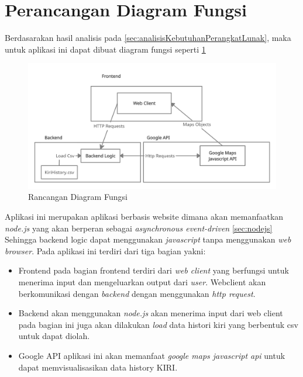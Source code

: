 \section{Perancangan Diagram Fungsi}
\label{sec:perancanganDiagramFungsi}
Berdasarakan hasil analisis pada  \ref{sec:analisisKebutuhanPerangkatLunak}, maka untuk aplikasi ini dapat dibuat diagram fungsi seperti \ref{fig:diagramFungsi} 
\begin{figure}[H]
	\centering  
	\includegraphics[scale=0.3]{Gambar/Kiri_functional_diagram.png}  
	\caption[Rancangan Diagram Kelas]{Rancangan Diagram Fungsi} 
	\label{fig:diagramFungsi} 
\end{figure}

Aplikasi ini merupakan aplikasi berbasis website dimana akan memanfaatkan \textit{node.js} yang akan berperan sebagai \textit{asynchronous event-driven} \ref{sec:nodejs} Sehingga  backend logic dapat menggunakan \textit{javascript} tanpa menggunakan \textit{web browser}. Pada aplikasi ini terdiri dari tiga bagian yakni:
\label{sec:tigakomponenet}
\begin{itemize}
    \item Frontend pada bagian frontend terdiri dari \textit{web client} yang berfungsi untuk menerima input dan mengeluarkan output dari \textit{user}. Webclient akan berkomunikasi dengan \textit{backend} dengan menggunakan \textit{http request}.
    
    \item Backend akan menggunakan \textit{node.js} akan menerima input dari web client pada bagian ini juga akan dilakukan \textit{load} data histori kiri yang berbentuk csv untuk dapat diolah.
    
    \item Google API aplikasi ini akan memanfaat \textit{google maps javascript api} untuk dapat memvisualisasikan data history KIRI.
\end{itemize}

